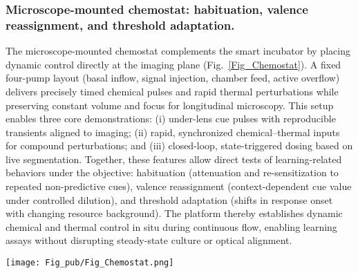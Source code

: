 \documentclass[aps,pre,twocolumn,floatfix,nofootinbib,amsmath,amssymb]{revtex4-2}
\begin{document}
\subsubsection{Microscope-mounted chemostat: habituation, valence reassignment, and threshold adaptation.} 
The microscope-mounted chemostat complements the smart incubator by placing dynamic control directly at the imaging plane (Fig.~\ref{Fig_Chemostat}). A fixed four-pump layout (basal inflow, signal injection, chamber feed, active overflow) delivers precisely timed chemical pulses and rapid thermal perturbations while preserving constant volume and focus for longitudinal microscopy. This setup enables three core demonstrations: (i) under-lens cue pulses with reproducible transients aligned to imaging; (ii) rapid, synchronized chemical–thermal inputs for compound perturbations; and (iii) closed-loop, state-triggered dosing based on live segmentation. Together, these features allow direct tests of learning-related behaviors under the objective: habituation (attenuation and re-sensitization to repeated non-predictive cues), valence reassignment (context-dependent cue value under controlled dilution), and threshold adaptation (shifts in response onset with changing resource background). The platform thereby establishes dynamic chemical and thermal control in situ during continuous flow, enabling learning assays without disrupting steady-state culture or optical alignment.


\begin{figure*}[t]
  \centering
  \texttt{[image: Fig\_pub/Fig\_Chemostat.png]}
  \caption{\textbf{Microscope-mounted chemostat.}
  (A) Schematic of continuous-flow control system showing media inflow, signal injection, chamber feed, and active overflow regulated by four pumps. An ESP32 controller coordinates flow and temperature modulation, enabling precisely timed cue pulses and thermal perturbations at the imaging plane.
  (B) Hardware implementation of the system, including the PCB control board, four-pump module, and media reservoirs. The setup preserves constant volume and focus during dosing, supporting longitudinal microscopy under dynamic cue delivery.}
  \label{Fig_Chemostat}
\end{figure*}
\end{document}
